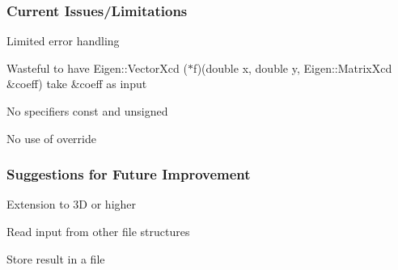 \subsubsection*{Current Issues/\+Limitations}


\begin{DoxyItemize}
\item Limited error handling
\item Wasteful to have {\ttfamily Eigen\+::\+Vector\+Xcd ($\ast$f)(double x, double y, Eigen\+::\+Matrix\+Xcd \&coeff)} take {\ttfamily \&coeff} as input
\item No specifiers const and unsigned
\item No use of override
\end{DoxyItemize}

\subsubsection*{Suggestions for Future Improvement}


\begin{DoxyItemize}
\item Extension to 3D or higher
\item Read input from other file structures
\item Store result in a file 
\end{DoxyItemize}
